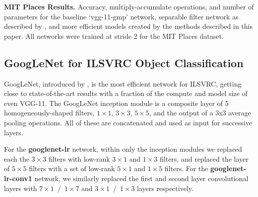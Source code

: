 \documentclass[thesis]{subfiles}
\begin{document}
    \begin{table}[tbp]
        \centering
        \caption[MIT Places results]{{\bf MIT Places Results.} Accuracy, multiply-accumulate operations, and number of parameters for the baseline `vgg-11-gmp' network, separable filter network as described by \citet{journals/corr/JaderbergVZ14}, and more efficient models created by the methods described in this paper. All networks were trained at stride 2 for the MIT Places dataset.
        }
        \data
        \pgfplotstabletypeset[
        every head row/.style={
            before row=\toprule,after row=\midrule},
        every last row/.style={
            after row=\bottomrule},
        fixed zerofill,     %
        columns={Network, Stride, Multiply-Acc., Param., Top-1 Acc., Top-5 Acc.},
        column type/.add={lrrrrrr}{},
        columns/Multiply-Acc./.style={
            column name=Multiple-Acc. {\small $\times 10^{8}$},
            preproc/expr={{##1/1e8}}
        },
        columns/Param./.style={
            column name=Param. {\small $\times 10^{7}$},
            preproc/expr={{##1/1e7}}
        },
        columns/Network/.style={string type},
        columns/Stride/.style={precision=0},
        columns/Top-1 Acc./.style={precision=3},
        columns/Top-5 Acc./.style={precision=3},
        highlight col max ={\data}{Top-1 Acc.},
        highlight col max ={\data}{Top-5 Acc.}, 
        highlight col min ={\data}{Param.}, 
        highlight col min ={\data}{Multiply-Acc.}, 
        col sep=comma]{\data}
        \label{table:placesresults}
    \end{table}
    
    
    \subsection{GoogLeNet for ILSVRC Object Classification}
    GoogLeNet, introduced by \citet{Szegedy2014going}, is the most efficient network for ILSVRC, getting close to state-of-the-art results with a fraction of the compute and model size of even VGG-11. The GoogLeNet inception module is a composite layer of 5 homogeneously-shaped filters, $1\times 1$, $3\times 3$, $5\times 5$, and the output of a 3x3 average pooling operations. All of these are concatenated and used as input for successive layers. 
    
    For the \textbf{googlenet-lr} network, within only the inception modules we replaced each the $3\times 3$ filters with low-rank $3 \times 1$ and $1\times 3$ filters, and replaced the layer of $5\times 5$ filters with a set of low-rank $5 \times 1$ and $1\times 5$ filters. For the \textbf{googlenet-lr-conv1} network, we similarly replaced the first and second layer convolutional layers with $7 \times 1$~/~$1\times 7$ and $3 \times 1$~/~$1\times 3$ layers respectively.
    
\end{document}
